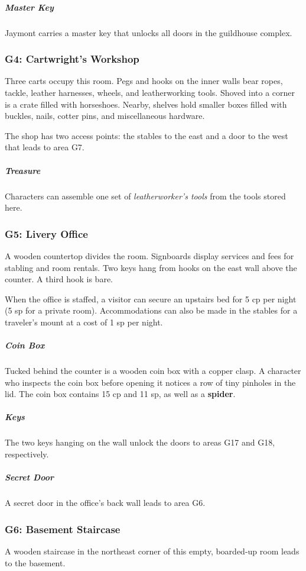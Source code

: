 \documentclass[10pt,a4paper,twoside,bg=print,twocolumn,openany,nodeprecatedcode]{dndbook}
\begin{document}
\subparagraph{Master Key}
Jaymont carries a master key that unlocks all doors in the guildhouse complex.

\subsubsection{G4: Cartwright's Workshop}
\begin{DndReadAloud}{}
Three carts occupy this room. Pegs and hooks on the inner walls bear ropes, tackle, leather harnesses, wheels, and leatherworking tools. Shoved into a corner is a crate filled with horseshoes. Nearby, shelves hold smaller boxes filled with buckles, nails, cotter pins, and miscellaneous hardware.

\end{DndReadAloud}

The shop has two access points: the stables to the east and a door to the west that leads to area G7.

\subparagraph{Treasure}
Characters can assemble one set of \textit{leatherworker's tools} from the tools stored here.

\subsubsection{G5: Livery Office}
\begin{DndReadAloud}{}
A wooden countertop divides the room. Signboards display services and fees for stabling and room rentals. Two keys hang from hooks on the east wall above the counter. A third hook is bare.

\end{DndReadAloud}

When the office is staffed, a visitor can secure an upstairs bed for 5 cp per night (5 sp for a private room). Accommodations can also be made in the stables for a traveler's mount at a cost of 1 sp per night.

\subparagraph{Coin Box}
Tucked behind the counter is a wooden coin box with a copper clasp. A character who inspects the coin box before opening it notices a row of tiny pinholes in the lid. The coin box contains 15 cp and 11 sp, as well as a \textbf{spider}.

\subparagraph{Keys}
The two keys hanging on the wall unlock the doors to areas G17 and G18, respectively.

\subparagraph{Secret Door}
A secret door in the office's back wall leads to area G6.

\subsubsection{G6: Basement Staircase}
\begin{DndReadAloud}{}
A wooden staircase in the northeast corner of this empty, boarded-up room leads to the basement.

\end{DndReadAloud}
\end{document}
